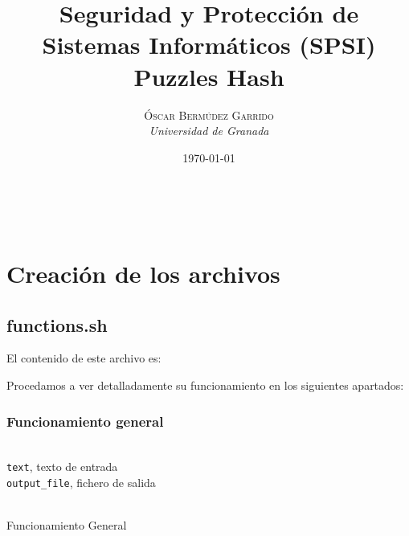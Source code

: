 \documentclass[a4paper, 11pt]{article}
\title{\textbf{Seguridad y Protección de Sistemas Informáticos (SPSI)}\\ %
Puzzles Hash} %
\author{\textsc{Óscar Bermúdez Garrido} %
\\{\textit{Universidad de Granada}}} %
\date{\today} %
\makeatletter
\renewcommand{\maketitle}{
  \begin{flushright} %
  
  {\LARGE\@title} %
  
  \vspace{50pt} %
  
  {\large\@author} %
  \\\@date %
  \vspace{40pt} %
  \end{flushright}
}
\makeatother
\begin{document}
\maketitle %

\renewcommand{\abstractname}{Resumen} %

{\parskip=2pt
  \tableofcontents
}
\pagebreak


\section{Creación de los archivos}
	\subsection{functions.sh}
		El contenido de este archivo es:

		\begin{scriptsize}
		
		\end{scriptsize}

		Procedamos a ver detalladamente su funcionamiento en los siguientes apartados:

		\subsubsection{Funcionamiento general}
			\begin{algorithm}[H]
				\begin{algorithmic}[1]
					\REQUIRE \ \\
						\texttt{text}, texto de entrada \\
						\texttt{output\_file}, fichero de salida \\ \
					\ENDWHILE
				\end{algorithmic}
				\caption{Funcionamiento General}
				\label{General}
			\end{algorithm}
	
\end{document}
